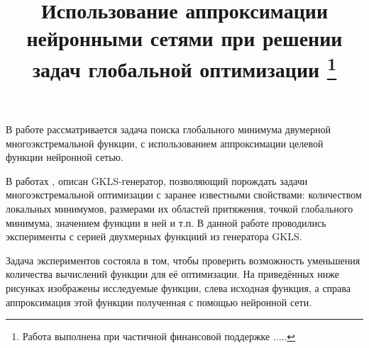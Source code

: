 \documentclass[11pt, oneside, a4paper]{article}
\begin{document}
\setcounter{page}{1}



\title{Использование аппроксимации нейронными сетями при решении задач глобальной оптимизации \footnote{Работа выполнена при частичной финансовой поддержке .....}}





В работе рассматривается задача поиска глобального минимума двумерной многоэкстремальной функции, с использованием аппроксимации целевой функции нейронной сетью. \cite{fio_bib1}\cite{fio_bib2}\cite{fio_bib3}\cite{fio_bib4}


В работах \cite{fio_bib5},\cite{fio_bib6} описан GKLS-генератор, позволяющий порождать задачи многоэкстремальной оптимизации с заранее известными свойствами: количеством локальных минимумов, размерами их областей притяжения, точкой глобального минимума, значением функции в ней и т.п. В данной работе проводились эксперименты с серией двухмерных функциий из генератора GKLS.


Задача экспериментов состояла в том, чтобы проверить возможность уменьшения количества вычислений функции для её оптимизации. На приведённых ниже рисунках изображены исследуемые функции, слева исходная функция, а справа аппроксимация этой функции полученная с помощью нейронной сети. 
\end{document}
